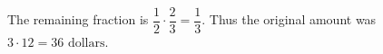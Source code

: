 The remaining fraction is $\dfrac{1}{2}\cdot\dfrac{2}{3}=\dfrac{1}{3}$. Thus the original amount was $3\cdot12=\boxed{36\text{ dollars}}$.
